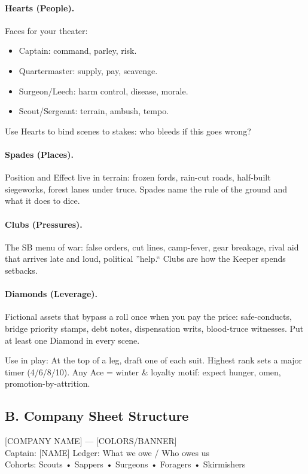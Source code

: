 \documentclass[11pt]{article}
\begin{document}
\paragraph{Hearts (People).} Faces for your theater:
\begin{itemize}
    \item Captain: command, parley, risk.
    \item Quartermaster: supply, pay, scavenge.
    \item Surgeon/Leech: harm control, disease, morale.
    \item Scout/Sergeant: terrain, ambush, tempo.
\end{itemize}
Use Hearts to bind scenes to stakes: who bleeds if this goes wrong?

\paragraph{Spades (Places).} Position and Effect live in terrain: frozen fords, rain-cut roads, half-built siegeworks, forest lanes under truce. Spades name the rule of the ground and what it does to dice.

\paragraph{Clubs (Pressures).} The SB menu of war: false orders, cut lines, camp-fever, gear breakage, rival aid that arrives late and loud, political ''help.`` Clubs are how the Keeper spends setbacks.

\paragraph{Diamonds (Leverage).} Fictional assets that bypass a roll once when you pay the price: safe-conducts, bridge priority stamps, debt notes, dispensation writs, blood-truce witnesses. Put at least one Diamond in every scene.

Use in play: At the top of a leg, draft one of each suit. Highest rank sets a major timer (4/6/8/10). Any Ace = winter \& loyalty motif: expect hunger, omen, promotion-by-attrition.

\subsection*{B. Company Sheet Structure}

[COMPANY NAME] --- [COLORS/BANNER]\\
Captain: [NAME] \hfill Ledger: What we owe / Who owes us\\
Cohorts: Scouts • Sappers • Surgeons • Foragers • Skirmishers
\end{document}
